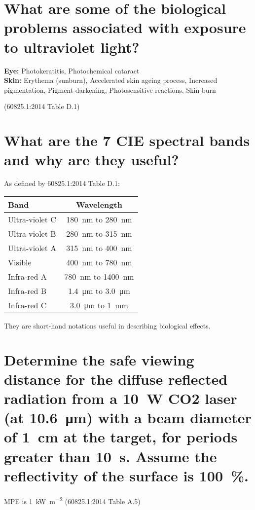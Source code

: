 \documentclass[a4paper]{scrartcl}
\begin{document}
\section{What are some of the biological problems associated with exposure to ultraviolet light?}
\textbf{Eye:} Photokeratitis, Photochemical cataract \\
\textbf{Skin:} Erythema (sunburn), Accelerated skin ageing process, Increased pigmentation, Pigment darkening, Photosensitive reactions, Skin burn

(60825.1:2014 Table D.1)

\section{What are the 7 CIE spectral bands and why are they useful?}
As defined by 60825.1:2014 Table D.1:

\begin{center}
    \begin{tabular}{l | c}
        Band & Wavelength \\
        \hline
        Ultra-violet C & \SI{180}{\nano\metre} to \SI{280}{\nano\metre} \\
        Ultra-violet B & \SI{280}{\nano\metre} to \SI{315}{\nano\metre} \\
        Ultra-violet A & \SI{315}{\nano\metre} to \SI{400}{\nano\metre} \\
        Visible & \SI{400}{\nano\metre} to \SI{780}{\nano\metre} \\
        Infra-red A & \SI{780}{\nano\metre} to \SI{1 400}{\nano\metre} \\
        Infra-red B & \SI{1.4}{\micro\metre} to \SI{3.0}{\micro\metre} \\
        Infra-red C & \SI{3.0}{\micro\metre} to \SI{1}{\milli\metre}
    \end{tabular}
\end{center}

They are short-hand notations useful in describing biological effects.

\section{Determine the safe viewing distance for the diffuse reflected radiation from a \SI{10}{\watt} CO2 laser (at \SI{10.6}{\micro\metre}) with a beam diameter of \SI{1}{\centi\metre} at the target, for periods greater than \SI{10}{\second}. Assume the reflectivity of the surface is \SI{100}{\percent}.}
MPE is \SI{1}{\kilo\watt\per\metre\squared} (60825.1:2014 Table A.5)
\end{document}
